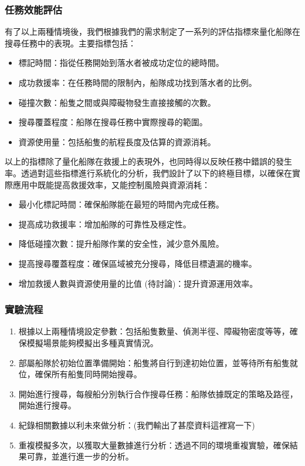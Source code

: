\documentclass[12pt,a4paper]{ctexart}
\begin{document}
\subsubsection{任務效能評估}
有了以上兩種情境後，我們根據我們的需求制定了一系列的評估指標來量化船隊在搜尋任務中的表現。主要指標包括：
\begin{itemize}
    \item 標記時間：指從任務開始到落水者被成功定位的總時間。
    \item 成功救援率：在任務時間的限制內，船隊成功找到落水者的比例。
    \item 碰撞次數：船隻之間或與障礙物發生直接接觸的次數。
    \item 搜尋覆蓋程度：船隊在搜尋任務中實際搜尋的範圍。
    \item 資源使用量：包括船隻的航程長度及估算的資源消耗。
\end{itemize}

以上的指標除了量化船隊在救援上的表現外，也同時得以反映任務中錯誤的發生率。透過對這些指標進行系統化的分析，我們設計了以下的終極目標，以確保在實際應用中既能提高救援效率，又能控制風險與資源消耗：
\begin{itemize}
    \item 最小化標記時間：確保船隊能在最短的時間內完成任務。
    \item 提高成功救援率：增加船隊的可靠性及穩定性。
    \item 降低碰撞次數：提升船隊作業的安全性，減少意外風險。
    \item 提高搜尋覆蓋程度：確保區域被充分搜尋，降低目標遺漏的機率。
    \item 增加救援人數與資源使用量的比值 (待討論)：提升資源運用效率。
\end{itemize}

\subsubsection{實驗流程}
\begin{enumerate}
    \item 根據以上兩種情境設定參數：包括船隻數量、偵測半徑、障礙物密度等等，確保模擬場景能夠模擬出多種真實情況。
    \item 部屬船隊於初始位置準備開始：船隻將自行到達初始位置，並等待所有船隻就位，確保所有船隻同時開始搜尋。
    \item 開始進行搜尋，每艘船分別執行合作搜尋任務：船隊依據既定的策略及路徑，開始進行搜尋。
    \item 紀錄相關數據以利未來做分析：(我們輸出了甚麼資料這裡寫一下)
    \item 重複模擬多次，以獲取大量數據進行分析：透過不同的環境重複實驗，確保結果可靠，並進行進一步的分析。
\end{enumerate}
\end{document}
